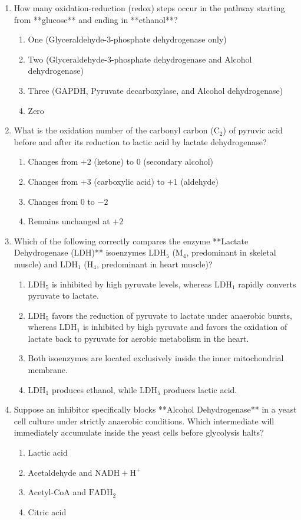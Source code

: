 \documentclass[11pt, a4paper]{article}
\begin{document}
\begin{enumerate}[label=\textbf{\arabic*.}]
\item How many oxidation-reduction (redox) steps occur in the pathway starting from **glucose** and ending in **ethanol**?
\begin{enumerate}[label=(\Alph*)]
    \item One (Glyceraldehyde-3-phosphate dehydrogenase only)
    \item Two (Glyceraldehyde-3-phosphate dehydrogenase and Alcohol dehydrogenase)
    \item Three (GAPDH, Pyruvate decarboxylase, and Alcohol dehydrogenase)
    \item Zero
\end{enumerate}

\item What is the oxidation number of the carbonyl carbon ($\text{C}_2$) of pyruvic acid before and after its reduction to lactic acid by lactate dehydrogenase?
\begin{enumerate}[label=(\Alph*)]
    \item Changes from $+2$ (ketone) to $0$ (secondary alcohol)
    \item Changes from $+3$ (carboxylic acid) to $+1$ (aldehyde)
    \item Changes from $0$ to $-2$
    \item Remains unchanged at $+2$
\end{enumerate}

\item Which of the following correctly compares the enzyme **Lactate Dehydrogenase (LDH)** isoenzymes $\text{LDH}_5$ (M$_4$, predominant in skeletal muscle) and $\text{LDH}_1$ (H$_4$, predominant in heart muscle)?
\begin{enumerate}[label=(\Alph*)]
    \item $\text{LDH}_5$ is inhibited by high pyruvate levels, whereas $\text{LDH}_1$ rapidly converts pyruvate to lactate.
    \item $\text{LDH}_5$ favors the reduction of pyruvate to lactate under anaerobic bursts, whereas $\text{LDH}_1$ is inhibited by high pyruvate and favors the oxidation of lactate back to pyruvate for aerobic metabolism in the heart.
    \item Both isoenzymes are located exclusively inside the inner mitochondrial membrane.
    \item $\text{LDH}_1$ produces ethanol, while $\text{LDH}_5$ produces lactic acid.
\end{enumerate}

\item Suppose an inhibitor specifically blocks **Alcohol Dehydrogenase** in a yeast cell culture under strictly anaerobic conditions. Which intermediate will immediately accumulate inside the yeast cells before glycolysis halts?
\begin{enumerate}[label=(\Alph*)]
    \item Lactic acid
    \item Acetaldehyde and $\text{NADH} + \text{H}^+$
    \item Acetyl-CoA and $\text{FADH}_2$
    \item Citric acid
\end{enumerate}


\end{enumerate}
\end{document}
